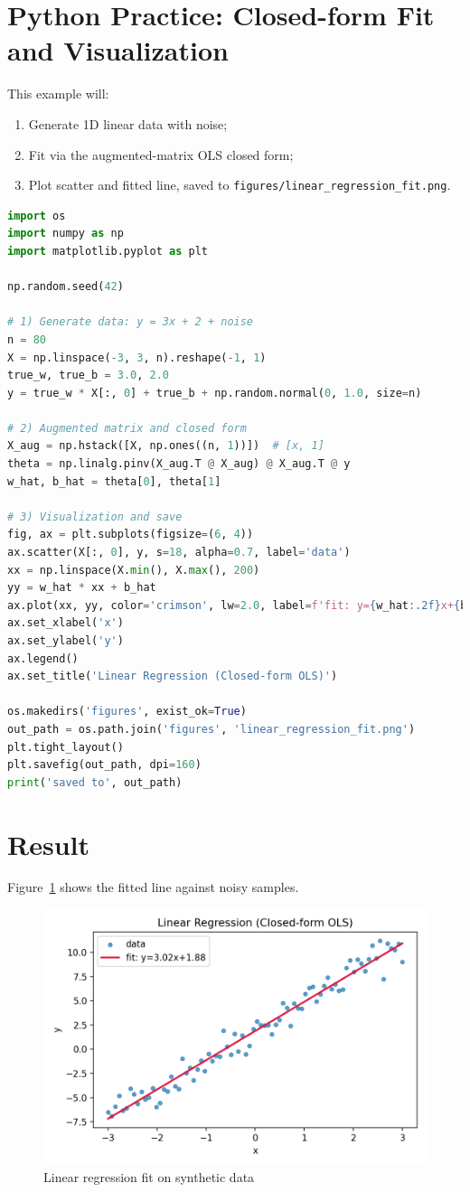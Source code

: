 \documentclass{article}
\begin{document}
\section{Python Practice: Closed-form Fit and Visualization}
This example will:
\begin{enumerate}
  \item Generate 1D linear data with noise;
  \item Fit via the augmented-matrix OLS closed form;
  \item Plot scatter and fitted line, saved to \texttt{figures/linear\_regression\_fit.png}.
\end{enumerate}

\begin{lstlisting}[language=Python,caption={linear_regression_closed_form.py}]
import os
import numpy as np
import matplotlib.pyplot as plt

np.random.seed(42)

# 1) Generate data: y = 3x + 2 + noise
n = 80
X = np.linspace(-3, 3, n).reshape(-1, 1)
true_w, true_b = 3.0, 2.0
y = true_w * X[:, 0] + true_b + np.random.normal(0, 1.0, size=n)

# 2) Augmented matrix and closed form
X_aug = np.hstack([X, np.ones((n, 1))])  # [x, 1]
theta = np.linalg.pinv(X_aug.T @ X_aug) @ X_aug.T @ y
w_hat, b_hat = theta[0], theta[1]

# 3) Visualization and save
fig, ax = plt.subplots(figsize=(6, 4))
ax.scatter(X[:, 0], y, s=18, alpha=0.7, label='data')
xx = np.linspace(X.min(), X.max(), 200)
yy = w_hat * xx + b_hat
ax.plot(xx, yy, color='crimson', lw=2.0, label=f'fit: y={w_hat:.2f}x+{b_hat:.2f}')
ax.set_xlabel('x')
ax.set_ylabel('y')
ax.legend()
ax.set_title('Linear Regression (Closed-form OLS)')

os.makedirs('figures', exist_ok=True)
out_path = os.path.join('figures', 'linear_regression_fit.png')
plt.tight_layout()
plt.savefig(out_path, dpi=160)
print('saved to', out_path)
\end{lstlisting}

\section{Result}
Figure~\ref{fig:fit} shows the fitted line against noisy samples.

\begin{figure}[h]
  \centering
  \includegraphics[width=0.75\linewidth]{linear_regression_fit.png}
  \caption{Linear regression fit on synthetic data}
  \label{fig:fit}
\end{figure}
\end{document}
